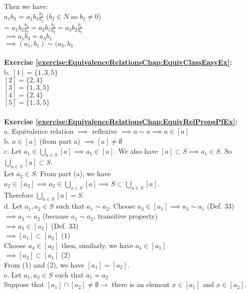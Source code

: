 Then we have:\\
$a_1b_3$ = $a_1b_3\displaystyle\frac{b_2}{b_2}$ ($b_2\in N$ so $b_2\neq 0$)\\
= $a_1b_2\displaystyle\frac{b_3}{b_2}=a_2b_1\displaystyle\frac{b_3}{b_2}=a_3b_2\displaystyle\frac{b_1}{b_2}$\\
$\implies a_1b_3=a_3b_1$\\
$\implies (a_1,b_1)\sim (a_3,b_3$\\
\\
\textbf{Exercise \ref{exercise:EquivalenceRelationsChap:EquivClassEasyEx}:}\\
b. $[1]=\{1,3,5\}$\\
$[2]=\{2,4\}$\\
$[3]=\{1,3,5\}$\\
$[4]=\{2,4\}$\\
$[5]=\{1,3,5\}$\\
\\
\textbf{Exercise \ref{exercise:EquivalenceRelationsChap:EquivRelPropsPfEx}:}\\
a. Equivalence relation $\implies$  reflexive $\implies a \sim a \implies a\in[a]$\\
b. $a\in [a]$ (from part a) $\implies [a]\neq \emptyset$\\
c. Let $a_1\in \bigcup_{a\in S}[a] \implies a_1\in [a]$. We also have $[a]\subset S \implies a_1\in S$. So $\bigcup_{a\in S}[a]\subset S$.\\
Let $a_2 \in S$. From part (a), we have $a_2 \in [a_2] \implies a_2\in\bigcup_{a\in S}[a] \implies S\subset \bigcup_{a\in S}[a]$.\\
Therefore $\bigcup_{a\in S}[a]=S$.\\
d. Let $a_1,a_2 \in S$ such that $a_1 \sim a_2$. Choose $a_3\in[a_1] \implies a_3 \sim a_1$ (Def. 33)\\
$\implies a_3 \sim a_2$ (because $a_1 \sim a_2$, transitive property)\\
$\implies a_3 \in [a_2]$ (Def. 33)\\
$\implies [a_1]\subset[a_2]$ (1)\\
Choose $a_4\in[a_2]$ then, similarly, we have $a_4\in[a_1]$\\
$\implies [a_2]\subset[a_1]$ (2)\\
From (1) and (2), we have $[a_1]=[a_2]$.\\
e. Let $a_1,a_2 \in S$ such that $a_1 \not\sim a_2$\\
Suppose that $[a_1]\cap[a_2]\neq\emptyset \to$ there is an element $x\in[a_1]$ and $x\in[a_2]$.\\
